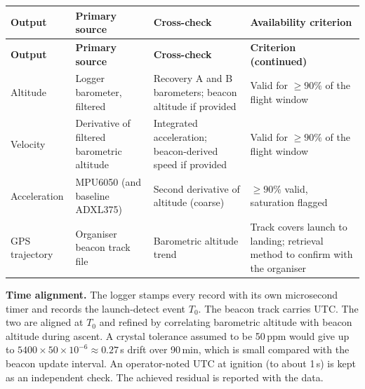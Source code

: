 \small
{}
\begin{longtable}{@{}L{24mm}L{40mm}L{42mm}L{40mm}@{}}
\toprule{}\textbf{Output}&\textbf{Primary source}&\textbf{Cross-check}&\textbf{Availability criterion}\\\midrule\endfirsthead
\toprule{}\textbf{Output}&\textbf{Primary source}&\textbf{Cross-check}&\textbf{Criterion (continued)}\\\midrule\endhead
\bottomrule\endlastfoot
Altitude & Logger barometer, filtered & Recovery A and B barometers; beacon altitude if provided & Valid for $\ge90\%$ of the flight window\\
Velocity & Derivative of filtered barometric altitude & Integrated acceleration; beacon-derived speed if provided & Valid for $\ge90\%$ of the flight window\\
Acceleration & MPU6050 (and baseline ADXL375) & Second derivative of altitude (coarse) & $\ge90\%$ valid, saturation flagged\\
GPS trajectory & Organiser beacon track file & Barometric altitude trend & Track covers launch to landing; retrieval method to confirm with the organiser\\
\end{longtable}
\normalsize

\textbf{Time alignment.} The logger stamps every record with its own microsecond timer and records the launch-detect event $T_0$. The beacon track carries UTC. The two are aligned at $T_0$ and refined by correlating barometric altitude with beacon altitude during ascent. A crystal tolerance assumed to be 50\,ppm would give up to $5400\times50\times10^{-6}\approx0.27$\,s drift over 90\,min, which is small compared with the beacon update interval. An operator-noted UTC at ignition (to about 1\,s) is kept as an independent check. The achieved residual is reported with the data.


